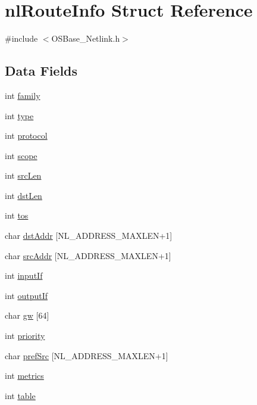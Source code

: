 \hypertarget{structnl_route_info}{
\section{nlRouteInfo Struct Reference}
\label{structnl_route_info}
}


{\ttfamily \#include $<$OSBase\_\-Netlink.h$>$}\subsection*{Data Fields}
\begin{DoxyCompactItemize}
\item 
int \hyperlink{structnl_route_info_a4417150d9f858949bd9ea8794995ebcc}{family}
\item 
int \hyperlink{structnl_route_info_ac765329451135abec74c45e1897abf26}{type}
\item 
int \hyperlink{structnl_route_info_ab30e8d7e05ae904d3248e0d51255c005}{protocol}
\item 
int \hyperlink{structnl_route_info_ae1af048ea44870cb8acef396ebc4ad09}{scope}
\item 
int \hyperlink{structnl_route_info_a2b4446e353d9a259ddd348e1bf3de330}{srcLen}
\item 
int \hyperlink{structnl_route_info_a1a152a3788b0ba020365726705f93ce9}{dstLen}
\item 
int \hyperlink{structnl_route_info_a6cf1ef2d03c680cc07a080b1c7abcb46}{tos}
\item 
char \hyperlink{structnl_route_info_a54b3e65a2c39c535e124ed189e508691}{dstAddr} \mbox{[}NL\_\-ADDRESS\_\-MAXLEN+1\mbox{]}
\item 
char \hyperlink{structnl_route_info_a49c2119e8045d06995653d332271ff8b}{srcAddr} \mbox{[}NL\_\-ADDRESS\_\-MAXLEN+1\mbox{]}
\item 
int \hyperlink{structnl_route_info_a65bea094a4f4aef320764f97df3c51d7}{inputIf}
\item 
int \hyperlink{structnl_route_info_ae0ce7856052fdb9a226716db04dba402}{outputIf}
\item 
char \hyperlink{structnl_route_info_a8f7553e71654921434772b3c49332e9a}{gw} \mbox{[}64\mbox{]}
\item 
int \hyperlink{structnl_route_info_acec9ce2df15222151ad66fcb1d74eb9f}{priority}
\item 
char \hyperlink{structnl_route_info_a1d8287d8eec6924f2c8d056cd1115b7f}{prefSrc} \mbox{[}NL\_\-ADDRESS\_\-MAXLEN+1\mbox{]}
\item 
int \hyperlink{structnl_route_info_afcee26a6d6f42393d37dd68d5562d062}{metrics}
\item 
int \hyperlink{structnl_route_info_a381b3daa303e1bdbac3a7b7000e0176c}{table}
\end{DoxyCompactItemize}


